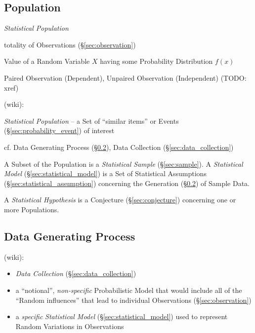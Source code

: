 \subsection{Population}\label{sec:population}

\emph{Statistical Population}

totality of Observations (\S\ref{sec:observation})

Value of a Random Variable $X$ having some Probability Distribution $f(x)$

Paired Observation (Dependent), Unpaired Observation (Independent) (TODO: xref)

(wiki):

\emph{Statistical Population} -- a Set of ``similar items'' or Events
(\S\ref{sec:probability_event}) of interest

\fist cf. Data Generating Process (\S\ref{sec:data_generating_process}), Data
Collection (\S\ref{sec:data_collection})

A Subset of the Population is a \emph{Statistical Sample} (\S\ref{sec:sample}).
A \emph{Statistical Model} (\S\ref{sec:statistical_model}) is a Set of
Statistical Assumptions (\S\ref{sec:statistical_assumption}) concerning the
Generation (\S\ref{sec:data_generating_process}) of Sample Data.

A \emph{Statistical Hypothesis} is a Conjecture (\S\ref{sec:conjecture})
concerning one or more Populations.



\subsection{Data Generating Process}\label{sec:data_generating_process}

(wiki):

\begin{itemize}
  \item \emph{Data Collection} (\S\ref{sec:data_collection})
  \item a ``notional'', \emph{non-specific} Probabilistic Model
    that would include all of the ``Random influences'' that lead to individual
    Observations (\S\ref{sec:observation})
  \item a \emph{specific} \emph{Statistical Model}
    (\S\ref{sec:statistical_model}) used to represent Random Variations in
    Observations
\end{itemize}


